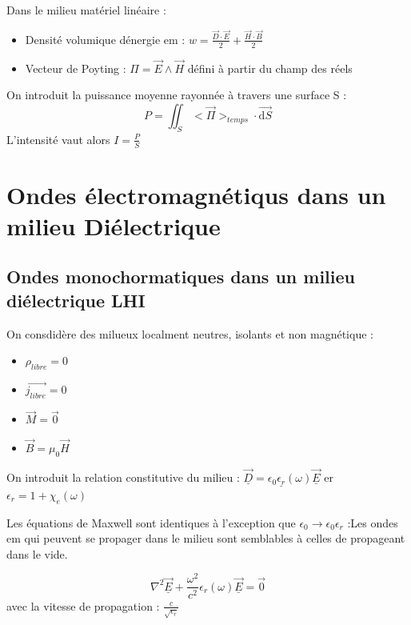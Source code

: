 \documentclass[french]{yLectureNote}
\renewcommand{\vec}{\overrightarrow}
\newcommand{\dd}{\mathrm{d}}
\newcommand{\lap}{\nabla^2}
\begin{document}
Dans le milieu matériel linéaire :
\begin{itemize}
    \item Densité volumique dénergie em : $w = \frac{\vec{D}\cdot \vec{E}}{2}+\frac{\vec{H}\cdot \vec{B}}{2}$
    \item Vecteur de Poyting : $\Pi = \vec{E}\wedge \vec{H}$ défini à partir du champ des réels 
\end{itemize}
On introduit la puissance moyenne rayonnée à travers une surface S :
$$P = \iint_S <\vec{\Pi}>_{temps}\cdot \vec{\dd S}$$
L'intensité vaut alors $ I = \frac{P}{S}$
\section{Ondes électromagnétiqus dans un milieu Diélectrique}
\subsection{Ondes monochormatiques dans un milieu diélectrique LHI}
On consdidère des milueux localment neutres, isolants et non magnétique :
\begin{itemize}
    \item $\rho_{libre} =0$
    \item $\vec{j_{libre}} = 0$
    \item $\vec{M} = \vec{0}$
    \item $\vec{B} = \mu_0\vec{H}$
\end{itemize}
On introduit la relation constitutive du milieu : $\vec{\underline{D}} = \epsilon_0\underline{\epsilon_r}(\omega)\vec{\underline{E}}$ er $\epsilon_r = 1+ \chi_e(\omega)$

Les équations de Maxwell sont identiques à l'exception que $\epsilon_0\to \epsilon_0\epsilon_r$ :Les ondes em qui peuvent se propager dans le milieu sont semblables à celles de propageant dans le vide.

$$\lap \vec{\underline{E}}+\frac{\omega^2}{c^2}\epsilon_r(\omega)\vec{\underline{E}}=\vec{0}$$
avec la vitesse de propagation : $\frac{c}{\sqrt{\epsilon_r}}$

 
\end{document}
